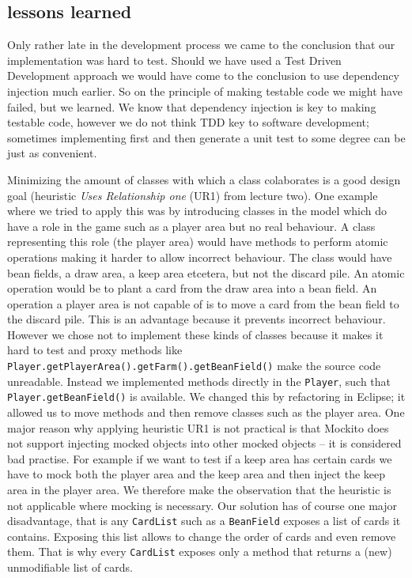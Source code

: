 \subsection{lessons learned}
Only rather late in the development process we came to the conclusion that our implementation was hard to test. Should we have used a Test
Driven Development approach we would have come to the conclusion to use dependency injection much earlier. So on the principle of making
testable code we might have failed, but we learned. We know that dependency injection is key to making testable code, however we do not
think TDD key to software development; sometimes implementing first and then generate a unit test to some degree can be just as convenient.

Minimizing the amount of classes with which a class colaborates is a good design goal (heuristic \emph{Uses Relationship
one} (UR1) from lecture two). One example where we tried to apply this was by introducing classes in the model which do have a role in the
game such as a player area but no real behaviour. A class representing this role (the player area) would have methods to perform atomic
operations making it harder to allow incorrect behaviour.
The class would have bean fields, a draw area, a keep area etcetera, but not the discard pile. An atomic operation would be to plant a card from the draw area into a bean field. An
operation a player area is not capable of is to move a card from the bean field to the discard pile. This is an advantage because it
prevents incorrect behaviour. However we chose not to implement these kinds of classes because it makes it hard to test and proxy methods like
\texttt{Player.getPlayerArea().getFarm().getBeanField()} make the source code unreadable. Instead we implemented methods directly in the
\texttt{Player}, such that \texttt{Player.getBeanField()} is available. We changed this by refactoring in Eclipse; it allowed us to move
methods and then remove classes such as the player area. One major reason why applying heuristic UR1 is not practical is that Mockito does
not support injecting mocked objects into other mocked objects -- it is considered bad practise. For example if we want to test if a keep area has certain cards we have to mock both the player area and the keep area and then inject the keep area in the player
area. We therefore make the observation that the heuristic is not applicable where mocking is necessary. Our solution has of course one
major disadvantage, that is any \texttt{CardList} such as a \texttt{BeanField} exposes a list of cards it contains. Exposing this list
allows to change the order of cards and even remove them. That is why every \texttt{CardList} exposes only a method that returns a (new)
unmodifiable list of cards.

